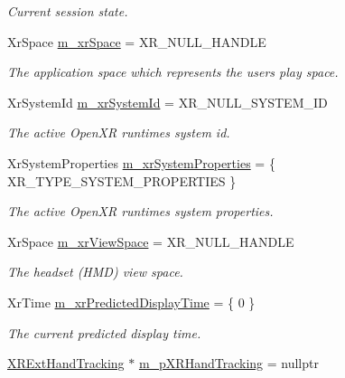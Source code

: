 \begin{DoxyCompactItemize}
\begin{DoxyCompactList}\small\item\em Current session state. \end{DoxyCompactList}\item 
Xr\+Space \mbox{\hyperlink{class_open_x_r_provider_1_1_x_r_provider_a1e442b83ade02dc6341d586779086049}{m\+\_\+xr\+Space}} = X\+R\+\_\+\+N\+U\+L\+L\+\_\+\+H\+A\+N\+D\+LE
\begin{DoxyCompactList}\small\item\em The application space which represents the user\textquotesingle{}s play space. \end{DoxyCompactList}\item 
Xr\+System\+Id \mbox{\hyperlink{class_open_x_r_provider_1_1_x_r_provider_ac737e2e5b04bd924012ea0c40636c136}{m\+\_\+xr\+System\+Id}} = X\+R\+\_\+\+N\+U\+L\+L\+\_\+\+S\+Y\+S\+T\+E\+M\+\_\+\+ID
\begin{DoxyCompactList}\small\item\em The active Open\+XR runtime\textquotesingle{}s system id. \end{DoxyCompactList}\item 
Xr\+System\+Properties \mbox{\hyperlink{class_open_x_r_provider_1_1_x_r_provider_a88b5c958163af32297db09ffc49ae23b}{m\+\_\+xr\+System\+Properties}} = \{ X\+R\+\_\+\+T\+Y\+P\+E\+\_\+\+S\+Y\+S\+T\+E\+M\+\_\+\+P\+R\+O\+P\+E\+R\+T\+I\+ES \}
\begin{DoxyCompactList}\small\item\em The active Open\+XR runtime\textquotesingle{}s system properties. \end{DoxyCompactList}\item 
Xr\+Space \mbox{\hyperlink{class_open_x_r_provider_1_1_x_r_provider_a5c3ba17df358b63e82c13ae09700f943}{m\+\_\+xr\+View\+Space}} = X\+R\+\_\+\+N\+U\+L\+L\+\_\+\+H\+A\+N\+D\+LE
\begin{DoxyCompactList}\small\item\em The headset (H\+MD) view space. \end{DoxyCompactList}\item 
Xr\+Time \mbox{\hyperlink{class_open_x_r_provider_1_1_x_r_provider_a5606d0dca9ff04f8936eeb77d9a8cea2}{m\+\_\+xr\+Predicted\+Display\+Time}} = \{ 0 \}
\begin{DoxyCompactList}\small\item\em The current predicted display time. \end{DoxyCompactList}\item 
\mbox{\hyperlink{class_open_x_r_provider_1_1_x_r_ext_hand_tracking}{X\+R\+Ext\+Hand\+Tracking}} $\ast$ \mbox{\hyperlink{class_open_x_r_provider_1_1_x_r_provider_a2e519f21d14fda1629859ad3e490d8fa}{m\+\_\+p\+X\+R\+Hand\+Tracking}} = nullptr
\end{DoxyCompactItemize}



